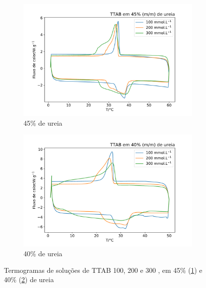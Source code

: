 	\begin{figure}[H]
		\centering
		\begin{subfigure}[t]{0.45\textwidth}
			\includegraphics[width=\textwidth]{./imagens/dsc/TTAB_45p}
			\caption{45\% de ureia}
			\label{fig:DSC_TTAB_UR45}
		\end{subfigure} \qquad %
		\begin{subfigure}[t]{0.45\textwidth}
			\includegraphics[width=\textwidth]{./imagens/dsc/TTAB_40p}
			\caption{40\% de ureia}
			\label{fig:DSC_TTAB_UR40}
		\end{subfigure}
		\caption{Termogramas de soluções de TTAB 100, 200 e 300 \mM{}, em 45\% (\ref{fig:DSC_TTAB_UR45}) e 40\% (\ref{fig:DSC_TTAB_UR40}) de ureia}
		\label{fig:DSC_TTAB_UR_40-45}
	\end{figure}
	
